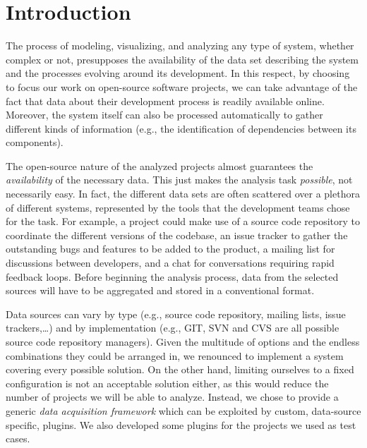 
\section{Introduction}

The process of modeling, visualizing, and analyzing any type of system, whether complex or not, presupposes the availability of the data set describing the system and the processes evolving around its development. In this respect, by choosing to focus our work on open-source software projects, we can take advantage of the fact that data about their development process is readily available online. Moreover, the system itself can also be processed automatically to gather different kinds of information (e.g., the identification of dependencies between its components).

The open-source nature of the analyzed projects almost guarantees the \emph{availability} of the necessary data. This just makes the analysis task \emph{possible}, not necessarily easy. In fact, the different data sets are often scattered over a plethora of different systems, represented by the tools that the development teams chose for the task. For example, a project could make use of a source code repository to coordinate the different versions of the codebase, an issue tracker to gather the outstanding bugs and features to be added to the product, a mailing list for discussions between developers, and a chat for conversations requiring rapid feedback loops. Before beginning the analysis process, data from the selected sources will have to be aggregated and stored in a conventional format.

Data sources can vary by type (e.g., source code repository, mailing lists, issue trackers,\ldots) and by implementation (e.g., GIT, SVN and CVS are all possible source code repository managers). Given the multitude of options and the endless combinations they could be arranged in, we renounced to implement a system covering every possible solution. On the other hand, limiting ourselves to a fixed configuration is not an acceptable solution either, as this would reduce the number of projects we will be able to analyze. Instead, we chose to provide a generic \emph{data acquisition framework} which can be exploited by custom, data-source specific, plugins. We also developed some plugins for the projects we used as test cases.

